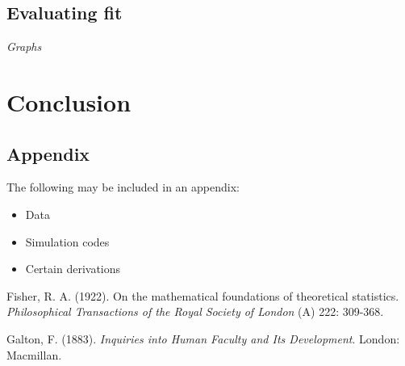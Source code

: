 \documentclass[12pt]{article}
\begin{document}
\subsection{Evaluating fit}



\emph{Graphs}

\section{Conclusion}\label{conclusion}







\newpage

\begin{appendix}
\section{Appendix}

\vspace{4mm}\noindent 
The following may be included in an appendix:

\begin{itemize}
\item[] Data 
\item[] Simulation codes
\item[] Certain derivations
\end{itemize}
\end{appendix}
\newpage

\begin{thebibliography}{99}

 Fisher, R. A. (1922). On the mathematical foundations of
theoretical statistics. {\it Philosophical Transactions of the Royal
Society of London} (A) 222: 309-368.

Galton, F. (1883). {\it Inquiries into Human Faculty and Its
Development}. London: Macmillan.

\end{thebibliography}
\end{document}
